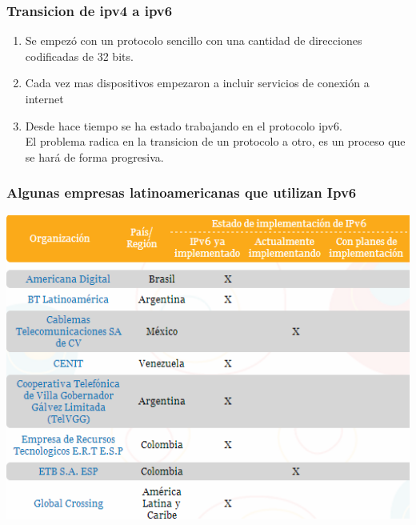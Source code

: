 \documentclass{beamer}
\begin{document}


\begin{frame}

\frametitle{Transicion de ipv4 a ipv6}

\begin{enumerate}[$*$]
	
	\item Se empezó con un protocolo sencillo con una cantidad de direcciones codificadas de 32 bits.
	\item Cada vez mas dispositivos empezaron a incluir servicios de conexión a internet
	\item Desde hace tiempo se ha estado trabajando en el protocolo ipv6.\\ El problema radica en la transicion de un protocolo a otro, es un proceso que se hará de forma progresiva.
\end{enumerate}

\end{frame}


\begin{frame}
\frametitle{Algunas empresas latinoamericanas que utilizan Ipv6}

\includegraphics[height=1\textheight]{empresas ipv6 la.png}

\end{frame}
\end{document}
